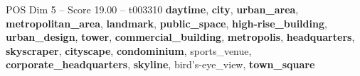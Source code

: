 \begin{textsample}{POS Dim 5 – Score 19.00 – t003310}  \label{ex:f5_pos_014}
\textbf{daytime}, \textbf{city}, \textbf{urban\_area}, \textbf{metropolitan\_area}, \textbf{landmark}, \textbf{public\_space}, \textbf{high-rise\_building}, \textbf{urban\_design}, \textbf{tower}, \textbf{commercial\_building}, \textbf{metropolis}, \textbf{headquarters}, \textbf{skyscraper}, \textbf{cityscape}, \textbf{condominium}, sports\_venue, \textbf{corporate\_headquarters}, \textbf{skyline}, bird's-eye\_view, \textbf{town\_square}

\end{textsample}

